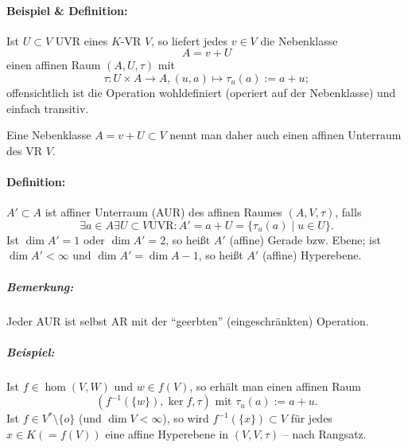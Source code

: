 
\paragraph{Beispiel \& Definition: }
	Ist $ U\subset V $ UVR eines $ K $-VR $ V $, so liefert jedes $ v\in V $ die Nebenklasse
		\[ A = v+U \]
	einen affinen Raum $ (A,U,\tau) $ mit 
		\[ \tau:U\times A\to A,(u,a)\mapsto \tau_u(a):= a+u; \]
	offensichtlich ist die Operation wohldefiniert (operiert auf der Nebenklasse) und einfach transitiv.
	
	Eine Nebenklasse $ A= v+U\subset V $ nennt man daher auch einen affinen Unterraum des VR $ V $.
\paragraph{Definition: }
	$ A'\subset A $ ist affiner Unterraum (AUR) des affinen Raumes $ (A,V,\tau) $, falls
		\[ \exists a\in A\exists U\subset V \text{UVR}:A' = a+U = \{\tau_u(a)\mid u\in U\}.\]
	Ist $ \dim A' =1 $ oder $ \dim A' = 2 $, so heißt $ A' $ (affine) Gerade bzw. Ebene; ist $ \dim A' < \infty $ und $ \dim A' = \dim A-1 $, so heißt $ A' $ (affine) Hyperebene.
\subparagraph{Bemerkung: }
	Jeder AUR ist selbst AR mit der "`geerbten"' (eingeschränkten) Operation.
\subparagraph{Beispiel: }
	Ist $ f\in \hom(V,W) $ und $ w\in f(V) $, so erhält man einen affinen Raum
		\[ (f^{-1}(\{w\}),\ker f,\tau) \text{ mit }\tau_u(a):= a+u.\]
	Ist $ f\in V^*\setminus \{o\} $ (und $ \dim V<\infty $), so wird $ f^{-1}(\{x\})\subset V $ für jedes $ x\in K (=f(V)) $ eine affine Hyperebene in $ (V,V,\tau) $ -- nach Rangsatz.